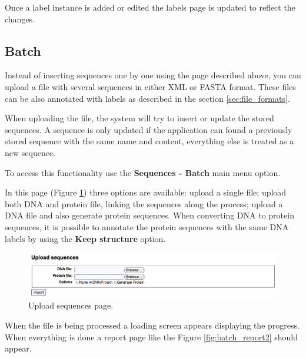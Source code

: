Once a label instance is added or edited the labels page is updated to reflect the changes.

\subsection{Batch}

Instead of inserting sequences one by one using the page described above, you can
upload a file with several sequences in either XML or FASTA format. These files
can be also annotated with labels as described in the section \ref{sec:file_formats}.

When uploading the file, the system will try to insert or update the stored sequences.
A sequence is only updated if the application can found a previously stored sequence with
the same name and content, everything else is treated as a new sequence.

To access this functionality use the \textbf{Sequences - Batch} main menu option.

In this page (Figure \ref{fig:sequence_upload2}) three options are available: upload a single file; upload both DNA and protein file, linking
the sequences along the process; upload a DNA file and also generate protein sequences.
When converting DNA to protein sequences, it is possible to annotate the protein sequences
with the same DNA labels by using the \textbf{Keep structure} option.

\begin{figure}[ht]
  \centering
    \includegraphics[scale=0.5]{sequence_upload.png}
  \caption{Upload sequences page.}
  \label{fig:sequence_upload2}
\end{figure}

When the file is being processed a loading screen appears displaying the progress.
When everything is done a report page like the Figure \ref{fig:batch_report2} should appear.

